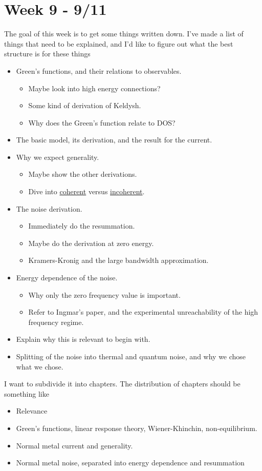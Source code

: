 \section{Week 9 - 9/11}
The goal of this week is to get some things written down. I've made a list of things that need to be explained, and I'd like to figure out what the best structure is for these things
\begin{itemize}
    \item Green's functions, and their relations to observables.
    \begin{itemize}
        \item Maybe look into high energy connections?
        \item Some kind of derivation of Keldysh.
        \item Why does the Green's function relate to DOS?
    \end{itemize}
    \item The basic model, its derivation, and the result for the current.
    \item Why we expect generality.
    \begin{itemize}
        \item Maybe show the other derivations.
        \item Dive into \underline{coherent} versus \underline{incoherent}.
    \end{itemize}
    \item The noise derivation.
    \begin{itemize}
        \item Immediately do the resummation.
        \item Maybe do the derivation at zero energy.
        \item Kramers-Kronig and the large bandwidth approximation.
    \end{itemize}
    \item Energy dependence of the noise.
    \begin{itemize}
        \item Why only the zero frequency value is important.
        \item Refer to Ingmar's paper, and the experimental unreachability of the high frequency regime.
    \end{itemize}
    \item Explain why this is relevant to begin with.
    \item Splitting of the noise into thermal and quantum noise, and why we chose what we chose.
\end{itemize}

I want to subdivide it into chapters. The distribution of chapters should be something like

\begin{itemize}
    \item Relevance
    \item Green's functions, linear response theory, Wiener-Khinchin, non-equilibrium.
    \item Normal metal current and generality.
    \item Normal metal noise, separated into energy dependence and resummation
\end{itemize}